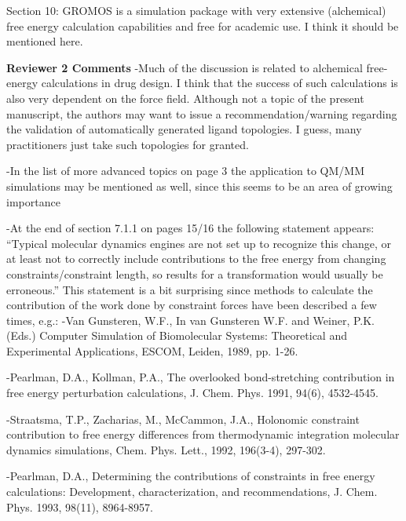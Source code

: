 \documentclass[10pt,stdletter]{newlfm}
\begin{document}
\begin{newlfm}
Section 10: GROMOS is a simulation package with very extensive (alchemical) free energy calculation capabilities and free for academic use. I think it should be mentioned here.


\textbf{Reviewer 2 Comments}
-Much of the discussion is related to alchemical free-energy calculations in drug design. I think that the success of such calculations is also very dependent on the force field. Although not a topic of the present manuscript, the authors may want to issue a recommendation/warning regarding the validation of automatically generated ligand topologies. I guess, many practitioners just take such topologies for granted.

\color[red]{We have added explicit comments in section 4.1 with respect to the need for using reasonable parameter/topology input files that have been inspected to make sure the molecular description has no obvious errors, or lack of chemical coverage in the method used to generate them}

-In the list of more advanced topics on page 3 the application to QM/MM simulations may be mentioned as well, since this seems to be an area of growing importance

\color[red]{MRS: we have added QM/MM explicitly in that list as an advanced topic beyond the scope of this document.}  

-At the end of section 7.1.1 on pages 15/16 the following statement appears: “Typical molecular dynamics engines are not set up to recognize this change, or at least not to correctly include contributions to the free energy from changing constraints/constraint length, so results for a transformation would usually be erroneous.” This statement is a bit surprising since methods to calculate the contribution of the work done by constraint forces have been described a few times, e.g.: 
-Van Gunsteren, W.F., In van Gunsteren W.F. and Weiner, P.K. (Eds.) Computer Simulation of Biomolecular Systems: Theoretical and Experimental Applications, ESCOM, Leiden, 1989, pp. 1-26. 

-Pearlman, D.A., Kollman, P.A., The overlooked bond-stretching contribution in free energy perturbation calculations, J. Chem. Phys. 1991, 94(6), 4532-4545.

-Straatsma, T.P., Zacharias, M., McCammon, J.A., Holonomic constraint contribution to free energy differences from thermodynamic integration molecular dynamics simulations, Chem. Phys. Lett., 1992, 196(3-4), 297-302.

-Pearlman, D.A., Determining the contributions of constraints in free energy calculations: Development, characterization, and recommendations, J. Chem. Phys. 1993, 98(11), 8964-8957.


\end{newlfm}
\end{document}
